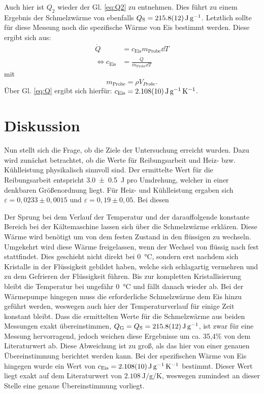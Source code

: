	Auch hier ist $Q_2$ wieder der Gl. \ref{eq:Q2} zu entnehmen. 
	Dies führt zu einem Ergebnis der Schmelzwärme von ebenfalls $Q_\text{S} = \SI{215.8+-1.2}{\joule\per\gram}$.
	Letztlich sollte für diese Messung noch die spezifische Wärme von Eis bestimmt werden.
	Diese ergibt sich aus:
	\begin{align}
		\dot{Q} &= c_\text{Eis} m_\text{Probe} \dd T\\
		\Leftrightarrow c_\text{Eis} &= \frac{\dot{Q}}{m_\text{Probe}\dd T}
	\end{align} %
	mit
	\begin{equation}
		m_\text{Probe} = \rho V_{Probe}.
	\end{equation} %
	Über Gl. \ref{eq:Q} ergibt sich hierfür: $c_\text{Eis}=\SI{2.108+-0.010}{\joule\per\gram\per\kelvin}$.
	
\section{Diskussion}
	
	Nun stellt sich die Frage, ob die Ziele der Untersuchung erreicht wurden.
	Dazu wird zunächst betrachtet, ob die Werte für Reibungsarbeit und Heiz- bzw. Kühlleistung physikalisch sinnvoll sind.
	Der ermittelte Wert für die Reibungsarbeit entspricht \SI{3.0+-0.5}{\joule} pro Umdrehung, welcher in einer denkbaren Größenordnung liegt.
	Für Heiz- und Kühlleistung ergaben sich $\varepsilon = 0,0233\pm 0,0015$ und $\varepsilon = 0,19\pm 0,05$.
	Bei diesen %
	
	Der Sprung bei dem Verlauf der Temperatur und der darauffolgende konstante Bereich bei der Kältemaschine lassen sich über die Schmelzwärme erklären.
	Diese Wärme wird benötigt um von dem festen Zustand in den flüssigen zu wechseln.
	Umgekehrt wird diese Wärme freigelassen, wenn der Wechsel von flüssig nach fest stattfindet.
	Dies geschieht nicht direkt bei \SI{0}{\celsius}, sondern erst nachdem sich Kristalle in der Flüssigkeit gebildet haben, welche sich schlagartig vermehren und zu dem Gefrieren der Flüssigkeit führen.
	Bis zur kompletten Kristallisierung bleibt die Temperatur bei ungefähr \SI{0}{\celsius} und fällt danach wieder ab.
	Bei der Wärmepumpe hingegen muss die erforderliche Schmelzwärme dem Eis hinzu geführt werden, weswegen auch hier der Temperaturverlauf für einige Zeit konstant bleibt. 
	Dass die ermittelten Werte für die Schmelzwärme aus beiden Messungen exakt übereinstimmen, $Q_\text{G} = Q_\text{S} = \SI{215.8+-1.2}{\joule\per\gram}$, ist zwar für eine Messung hervorragend, jedoch weichen diese Ergebnisse um ca. 35,4\% von dem Literaturwert\cite{Toolbox} ab.
	Diese Abweichung ist zu groß, als das hier von einer genauen Übereinstimmung berichtet werden kann.
	Bei der spezifischen Wärme von Eis hingegen wurde ein Wert von $c_\text{Eis}=\SI{2.108+-0.010}{\joule\per\gram\per\kelvin}$ bestimmt. 
	Dieser Wert liegt exakt auf dem Literaturwert\cite{Toolbox} von $\SI{2.108}{\joule\per\gram\per\kelvin}$, weswegen zumindest an dieser Stelle eine genaue Übereinstimmung vorliegt.
	